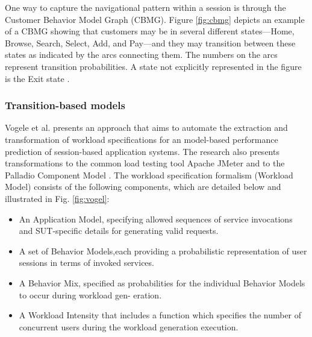 \documentclass{report}
\begin{document}
One way to capture the navigational pattern within a session is through the Customer Behavior Model Graph (CBMG). Figure \ref{fig:cbmg} depicts an example of a CBMG showing that customers may be in several different states—Home, Browse, Search, Select, Add, and Pay—and they may transition between these states as indicated by the arcs connecting them. The numbers on the arcs represent transition probabilities. A state not explicitly represented in the figure is the Exit state \cite{Menasce2002a} \cite{Jiang2010} \cite{MohammadS.Obaidat}.



\subsubsection{Transition-based models}


Vogele et al. presents an approach that aims to automate the extraction and transformation of workload specifications for an model-based performance prediction of session-based application systems.  The research also presents transformations to the common load testing tool Apache JMeter and to the Palladio Component Model \cite{Vogele2016}. The workload specification formalism (Workload Model) consists of the following components, which are detailed below and illustrated in Fig. \ref{fig:vogel}:
\begin{itemize}
\item An Application Model, specifying allowed sequences of service invocations and SUT-specific details for generating valid requests.
\item A set of Behavior Models,each providing a probabilistic representation of user sessions in terms of invoked services.
\item A Behavior Mix, specified as probabilities for the individual Behavior Models to occur during workload gen- eration.
\item A Workload Intensity that includes a function which specifies the number of concurrent users during the workload generation execution.
\end{itemize}
\end{document}
